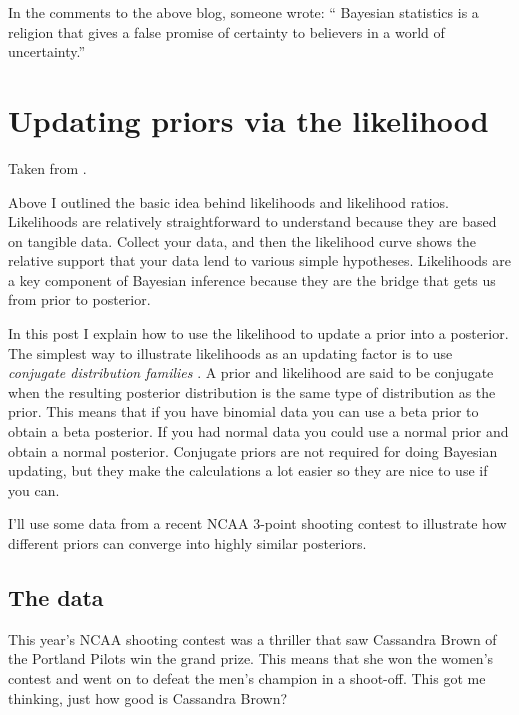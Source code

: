 In the comments to the above blog, someone wrote:
`` Bayesian statistics is a religion that gives a false promise of certainty to believers in a world of uncertainty.''



\section{Updating priors via the likelihood}
\label{sec:Updatingpriorsviathelikelihood}

Taken from  \cite{etz2015d}.

Above I outlined the basic idea behind likelihoods and likelihood ratios. Likelihoods are relatively straightforward to understand because they are based on tangible data. Collect your data, and then the likelihood curve shows the relative support that your data lend to various simple hypotheses. Likelihoods are a key component of Bayesian inference because they are the bridge that gets us from prior to posterior.

In this post I explain how to use the likelihood to update a prior into a posterior. The simplest way to illustrate likelihoods as an updating factor is to use \textit{conjugate distribution families} \cite{Raiffa2000}. A prior and likelihood are said to be conjugate when the resulting posterior distribution is the same type of distribution as the prior. This means that if you have binomial data you can use a beta prior to obtain a beta posterior. If you had normal data you could use a normal prior and obtain a normal posterior. Conjugate priors are not required for doing Bayesian updating, but they make the calculations a lot easier so they are nice to use if you can.

I'll use some data from a recent NCAA 3-point shooting contest to illustrate how different priors can converge into highly similar posteriors.

\subsection{The data}

This year's NCAA shooting contest was a thriller that saw Cassandra Brown of the Portland Pilots win the grand prize. This means that she won the women's contest and went on to defeat the men's champion in a shoot-off. This got me thinking, just how good is Cassandra Brown?

